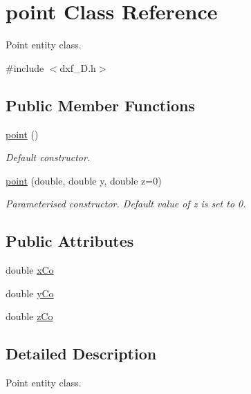 \hypertarget{classpoint}{\section{point Class Reference}
\label{classpoint}
}


Point entity class.  




{\ttfamily \#include $<$dxf\-\_\-D.\-h$>$}

\subsection*{Public Member Functions}
\begin{DoxyCompactItemize}
\item 
\hyperlink{classpoint_a5fe21d4a4539320bf0f5caf1218d31c8}{point} ()
\begin{DoxyCompactList}\small\item\em Default constructor. \end{DoxyCompactList}\item 
\hypertarget{classpoint_add30ab9b6541ecd9322b989ff15f7cd3}{\hyperlink{classpoint_add30ab9b6541ecd9322b989ff15f7cd3}{point} (double, double y, double z=0)}\label{classpoint_add30ab9b6541ecd9322b989ff15f7cd3}

\begin{DoxyCompactList}\small\item\em Parameterised constructor. Default value of z is set to 0. \end{DoxyCompactList}\end{DoxyCompactItemize}
\subsection*{Public Attributes}
\begin{DoxyCompactItemize}
\item 
double \hyperlink{classpoint_aec4b8ad23ee8298cbf137c25906863cf}{x\-Co}
\item 
double \hyperlink{classpoint_a94a7f69d2ac81f8a229263aa743a0e6f}{y\-Co}
\item 
double \hyperlink{classpoint_a7a939155420b87e651d18dd364e017b1}{z\-Co}
\end{DoxyCompactItemize}


\subsection{Detailed Description}
Point entity class. 

